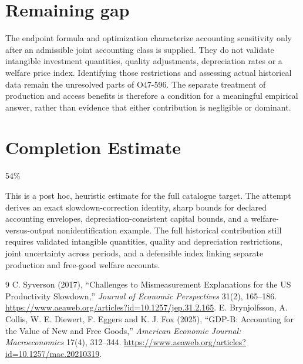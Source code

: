 \documentclass[11pt]{article}
\theoremstyle{definition}
\begin{document}
\section*{Remaining gap}
The endpoint formula and optimization characterize accounting sensitivity only after an admissible joint accounting class is supplied. They do not validate intangible investment quantities, quality adjustments, depreciation rates or a welfare price index. Identifying those restrictions and assessing actual historical data remain the unresolved parts of O47-596. The separate treatment of production and access benefits is therefore a condition for a meaningful empirical answer, rather than evidence that either contribution is negligible or dominant.

\section{Completion Estimate}
54\%

This is a post hoc, heuristic estimate for the full catalogue target.
The attempt derives an exact slowdown-correction identity, sharp bounds for declared accounting envelopes, depreciation-consistent capital bounds, and a welfare-versus-output nonidentification example. The full historical contribution still requires validated intangible quantities, quality and depreciation restrictions, joint uncertainty across periods, and a defensible index linking separate production and free-good welfare accounts.

\begin{thebibliography}{9}
 C. Syverson (2017), ``Challenges to Mismeasurement Explanations for the US Productivity Slowdown,'' \emph{Journal of Economic Perspectives} 31(2), 165--186. \url{https://www.aeaweb.org/articles?id=10.1257/jep.31.2.165}.
 E. Brynjolfsson, A. Collis, W. E. Diewert, F. Eggers and K. J. Fox (2025), ``GDP-B: Accounting for the Value of New and Free Goods,'' \emph{American Economic Journal: Macroeconomics} 17(4), 312--344. \url{https://www.aeaweb.org/articles?id=10.1257/mac.20210319}.
\end{thebibliography}
\end{document}
